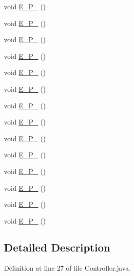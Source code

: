 \begin{DoxyCompactItemize}
\item 
void \mbox{\hyperlink{classsample_1_1_controller_a992bbe73bf2149a64836d4e492ea063f}{E\+\_\+\+P\+\_}} ()
\item 
void \mbox{\hyperlink{classsample_1_1_controller_a617d833c65c9ed2d32521cbcafb45d5e}{E\+\_\+\+P\+\_}} ()
\item 
void \mbox{\hyperlink{classsample_1_1_controller_a900f41d37b076cf19e1c5934624aa615}{E\+\_\+\+P\+\_}} ()
\item 
void \mbox{\hyperlink{classsample_1_1_controller_a17fd074499bfa5caf47eef8078e23248}{E\+\_\+\+P\+\_}} ()
\item 
void \mbox{\hyperlink{classsample_1_1_controller_a44dbcfa90d872e976919551f5915be35}{E\+\_\+\+P\+\_}} ()
\item 
void \mbox{\hyperlink{classsample_1_1_controller_ae8e564572e0541f7ddbdd64a15f7b64e}{E\+\_\+\+P\+\_}} ()
\item 
void \mbox{\hyperlink{classsample_1_1_controller_a30de0d9eb04d7a55580d9f6ec1bcff56}{E\+\_\+\+P\+\_}} ()
\item 
void \mbox{\hyperlink{classsample_1_1_controller_a028fd8964bd61cfc158d746fd37c0d0a}{E\+\_\+\+P\+\_}} ()
\item 
void \mbox{\hyperlink{classsample_1_1_controller_a55895c17098dcb03182e6e7c6f154684}{E\+\_\+\+P\+\_}} ()
\item 
void \mbox{\hyperlink{classsample_1_1_controller_abf0ae558632ff591568a3517a948c6ed}{E\+\_\+\+P\+\_}} ()
\item 
void \mbox{\hyperlink{classsample_1_1_controller_aa1b5e39db5dcf0c553aa45f44c0cb72c}{E\+\_\+\+P\+\_}} ()
\item 
void \mbox{\hyperlink{classsample_1_1_controller_a8b9cc53e878a4f29a353d972a15714d2}{E\+\_\+\+P\+\_}} ()
\item 
void \mbox{\hyperlink{classsample_1_1_controller_a66a8564ec98bf583a800fc047ae4ebdd}{E\+\_\+\+P\+\_}} ()
\item 
void \mbox{\hyperlink{classsample_1_1_controller_ad5764c8888d08748f638de25589c6f5b}{E\+\_\+\+P\+\_}} ()
\end{DoxyCompactItemize}


\subsection{Detailed Description}


Definition at line 27 of file Controller.\+java.



